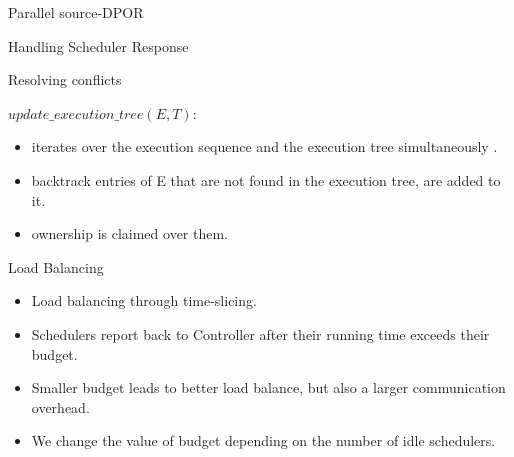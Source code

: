 \documentclass[9pt]{beamer}
\begin{document}
\begin{frame} {Parallel source-DPOR}

\begin{algorithm}[H]
    \caption{Handling Scheduler Response}
    \label{response}
\end{algorithm}


\end{frame}
\begin{frame}{Resolving conflicts}

$update\_execution\_tree(E, T)$:

\begin{itemize}
\item iterates
over the execution sequence and the execution tree simultaneously .
\item backtrack entries of E that are not found in the execution tree, are added to it.
\item ownership is claimed over them.


\end{itemize}

\end{frame}


\begin{frame} {Load Balancing}

\begin{itemize}[<+->]

\item Load balancing through time-slicing.

\item Schedulers report back to Controller after their running time exceeds their budget.

\item Smaller budget leads to better load balance, but also a larger communication overhead.

\item We change the value of budget depending on the number of idle schedulers.


\end{itemize}

\end{frame}
\end{document}
